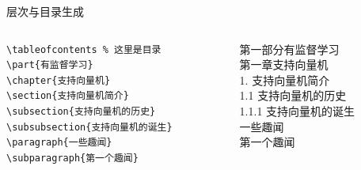 \begin{frame}[fragile]{层次与目录生成}
\begin{columns}
\begin{column}{.5\textwidth}

\begin{verbatim}
\tableofcontents % 这里是目录
\part{有监督学习}
\chapter{支持向量机}
\section{支持向量机简介}
\subsection{支持向量机的历史}
\subsubsection{支持向量机的诞生}
\paragraph{一些趣闻}
\subparagraph{第一个趣闻}
\end{verbatim}
\end{column}
\begin{column}{.5\textwidth}
第一部分\quad 有监督学习\\
第一章\quad 支持向量机 \\
1. 支持向量机简介 \\
1.1 支持向量机的历史 \\
1.1.1 支持向量机的诞生 \\
一些趣闻  \\
第一个趣闻
\end{column}
\end{columns}

\end{frame}


